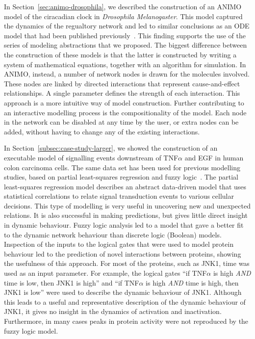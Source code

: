 In Section~\ref{sec:animo-drosophila}, we described the construction of an ANIMO
model of the ciracadian clock in \emph{Drosophila Melanogaster}. This model
captured the dynamics of the regualtory network and led to similar 
conclusions as an ODE model that had been
published previously~\citep{drosophila-ode-model}. This finding supports the use of
the series of modeling abstractions that we proposed. The biggest
difference between the construction of these models is that the latter
is constructed by writing a system of mathematical equations, together
with an algorithm for simulation. In ANIMO, instead, a number of network
nodes is drawn for the molecules involved. These nodes are linked by directed
interactions that represent cause-and-effect relationships. 
A single parameter defines the strength of each
interaction. This approach is a more intuitive way of model
construction. Further contributing to an interactive modelling process
is the compositionality of the model. Each node in the network
can be disabled at any time by the user, or extra nodes can be added,
without having to change any of the existing interactions.

In Section~\ref{subsec:case-study-larger}, we showed the construction of an executable model
of signalling events downstream of
TNF$\alpha$ and EGF in human colon carcinoma cells. The same data set has been used for
previous modelling studies, based on partial least-squares regression and fuzzy logic~\citep{pathway-leastsquare,pathway-fuzzy}.
The partial least-squares regression model describes an abstract data-driven model that uses statistical correlations
to relate signal transduction events to various cellular decisions. This type of modelling is
very useful in uncovering new and unexpected relations. It is also successful in making
predictions, but gives little direct insight in dynamic behaviour. Fuzzy
logic analysis led to a model that gave a better fit to the dynamic network behaviour than
discrete logic (Boolean) models. Inspection of the inputs to the logical gates that were used
to model protein behaviour led to the prediction of novel interactions between proteins,
showing the usefulness of this approach. For most of the proteins, such as JNK1, time was
used as an input parameter. For example, the logical gates ``if TNF$\alpha$ is high
\emph{AND} time is low, then JNK1 is high'' and ``if TNF$\alpha$ is high \emph{AND} time is
high, then JNK1 is low'' were used to
describe the dynamic behaviour of JNK1. Although this leads to a useful and representative
description of the dynamic behaviour of JNK1, it gives no insight in the dynamics
of activation and inactivation. Furthermore, in many cases peaks in protein activity were
not reproduced by the fuzzy logic model.

